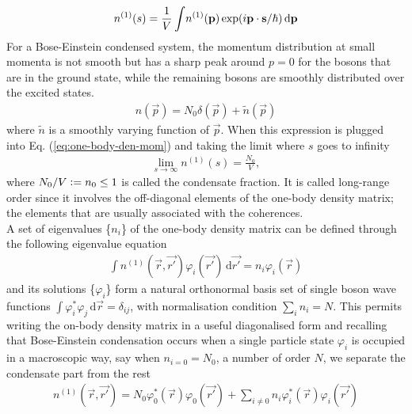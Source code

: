 			\begin{align}
				n^{(1)}(s) = \frac{1}{V}\int \! n^{(1)}\qty(\bm{\mathrm{p}})\exp(i\bm{\mathrm{p}}\cdot\bm{\mathrm{s}}/\hbar)\,\mathrm{d}\bm{\mathrm{p}} \label{eq:one-body-den-mom}
			\end{align}
			For a Bose-Einstein condensed system, the momentum distribution at small momenta is not smooth but has a sharp peak around $p=0$ for the bosons that are in the ground state, while the remaining bosons are smoothly distributed over the excited states.
			\begin{align}
				n(\vec{p})=N_0\delta(\vec{p})+\tilde{n}(\vec{p})
			\end{align}
			where $\tilde{n}$ is a smoothly varying function of $\vec{p}$. When this expression is plugged into Eq. (\ref{eq:one-body-den-mom}) and taking the limit where $s$ goes to infinity
			\begin{align}
				\lim_{s\rightarrow\infty}n^{(1)}(s)=\frac{N_0}{V},
			\end{align}
			where $N_0/V \vcentcolon= n_0\leq 1$ is called the condensate fraction. It is called long-range order since it involves the off-diagonal elements of the one-body density matrix; the elements that are usually associated with the coherences.\\
			
			A set of eigenvalues \{$n_i$\} of the one-body density matrix can be defined through the following eigenvalue equation
			\begin{align}
				\int \! n^{(1)}(\vec{r},\vec{r'})\varphi_i(\vec{r'}) \,\mathrm{d}\vec{r'} = n_i\varphi_i(\vec{r})
			\end{align}
			and its solutions \{$\varphi_i$\} form a natural orthonormal basis set of single boson wave functions $\int\!\varphi_i^*\varphi_j\,\mathrm{d}\vec{r}=\delta_{ij}$, with normalisation condition $\sum_i n_i=N$. This permits writing the on-body density matrix in a useful diagonalised form and recalling that Bose-Einstein condensation occurs when a single particle state $\varphi_i$ is occupied in a macroscopic way, say when $n_{i=0}=N_0$, a number of order $N$, we separate the condensate part from the rest
			\begin{align}
				n^{(1)}(\vec{r},\vec{r'}) = N_0\varphi_0^*(\vec{r})\varphi_0(\vec{r'})+\sum_{i\neq0}n_i\varphi_i^*(\vec{r})\varphi_i(\vec{r'}) \label{eq:obdm-diag}
			\end{align}

